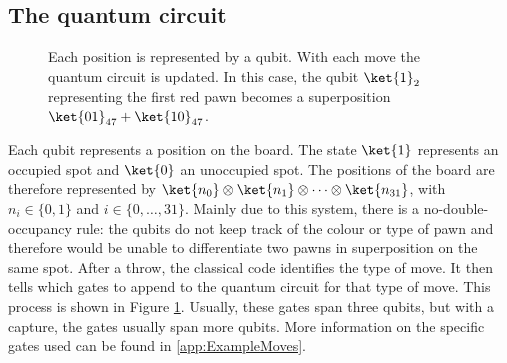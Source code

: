\documentclass[final,5p,times,twocolumn,authoryear]{elsarticle}
\begin{document}
\subsection{The quantum circuit}
\label{quantum_circuit}
\begin{figure*}[b!]
    \centering
    
    \caption{Each position is represented by a qubit. With each move the quantum circuit is updated. In this case, the qubit $\ket{1}_2$ representing the first red pawn becomes a superposition $\ket{01}_{47}+\ket{10}_{47}$.}
    \label{fig:general_implementation}
\end{figure*}
Each qubit represents a position on the board. The state $\ket{1}$ represents an occupied spot and $\ket{0}$ an unoccupied spot. The positions of the board are therefore represented by $\ket{n_0} \otimes \ket{n_1} \otimes \dots \otimes \ket{n_{31}}$, with $n_i \in \{0, 1\}$ and $i \in \{0, \dots, 31\}$. Mainly due to this system, there is a no-double-occupancy rule: the qubits do not keep track of the colour or type of pawn and therefore would be unable to differentiate two pawns in superposition on the same spot.
After a throw, the classical code identifies the type of move. It then tells which gates to append to the quantum circuit for that type of move.
This process is shown in Figure \ref{fig:general_implementation}. Usually, these gates span three qubits, but with a capture, the gates usually span more qubits. More information on the specific gates used can be found in \ref{app:ExampleMoves}.
\end{document}
